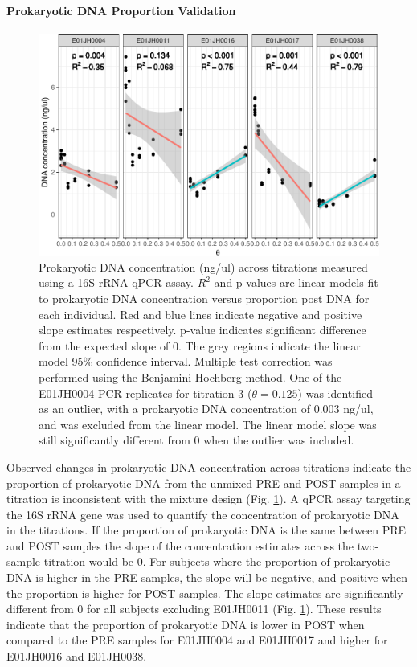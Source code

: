 \documentclass[linenumbers]{bmcart}
\begin{document}
\paragraph*{Prokaryotic DNA Proportion Validation}

\begin{figure}
\centering
\includegraphics{bacPlot-1.pdf}
\caption{\label{fig:bacPlot}Prokaryotic DNA concentration (ng/ul) across
titrations measured using a 16S rRNA qPCR assay. \(R^2\) and p-values are linear models fit to prokaryotic DNA concentration versus proportion post DNA for each individual.
Red and blue lines indicate negative and positive slope estimates respectively.
p-value indicates significant difference from the expected slope of 0.
The grey regions indicate the linear model 95\% confidence interval.
Multiple test correction was performed using the Benjamini-Hochberg
method. One of the E01JH0004 PCR replicates for titration 3
(\(\theta=0.125\)) was identified as an outlier, with a prokaryotic DNA
concentration of 0.003 ng/ul, and was excluded from the linear model.
The linear model slope was still significantly different from 0 when the
outlier was included.}
\end{figure}

Observed changes in prokaryotic DNA concentration across titrations
indicate the proportion of prokaryotic DNA from the unmixed PRE and POST
samples in a titration is inconsistent with the mixture design (Fig.
\ref{fig:bacPlot}). A qPCR assay targeting the 16S rRNA gene was used to
quantify the concentration of prokaryotic DNA in the titrations. If the
proportion of prokaryotic DNA is the same between PRE and POST samples
the slope of the concentration estimates across the two-sample titration
would be 0. For subjects where the proportion of prokaryotic DNA is
higher in the PRE samples, the slope will be negative, and positive when
the proportion is higher for POST samples. The slope estimates are
significantly different from 0 for all subjects excluding E01JH0011
(Fig. \ref{fig:bacPlot}). These results indicate that the proportion of
prokaryotic DNA is lower in POST when compared to the PRE samples for
E01JH0004 and E01JH0017 and higher for E01JH0016 and E01JH0038.
\end{document}
